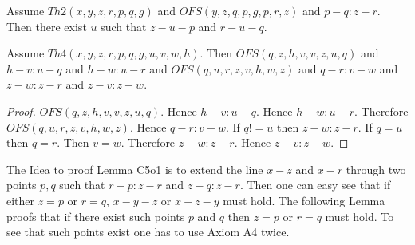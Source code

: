 \documentclass{article}
\begin{document}
\begin{forthel}
    \begin{lemma}[C5o1n]
      Assume $Th2(x,y,z,r,p,q,g)$ and $OFS(y,z,q,p,g,p,r,z)$ and $p-q : z-r$. Then there exist $u$ such that $z-u-p$ and $r-u-q$.
    \end{lemma}

    \begin{lemma}[C5o1o]
      Assume $Th4(x,y,z,r,p,q,g,u,v,w,h)$. Then $OFS(q,z,h,v,v,z,u,q)$ and $h-v : u-q$ and $h-w : u-r$ and $OFS(q,u,r,z,v,h,w,z)$ and $q-r : v-w$ and $z-w : z-r$ and $z-v : z-w$.
    \end{lemma}
    \begin{proof}
    	$OFS(q,z,h,v,v,z,u,q)$. Hence $h-v : u-q$.
      Hence $h-w : u-r$. %
    	Therefore $OFS(q,u,r,z,v,h,w,z)$. Hence $q-r : v-w$. If $q != u$ then $z-w : z-r$.
      If $q = u$ then $q = r$. %
    	Then $v = w$. Therefore $z-w : z-r$. Hence $z-v : z-w$.
    \end{proof}
  \end{forthel}

  The Idea to proof Lemma C5o1 is to extend the line $x-z$ and $x-r$ through two points $p,q$ such that $r-p : z-r$ and $z-q : z-r$. Then one can easy see that if either $z = p$ or $r = q$, $x-y-z$ or $x-z-y$ must hold. The following Lemma proofs that if there exist such points $p$ and $q$ then $z = p$ or $r = q$ must hold. To see that such points exist one has to use Axiom A4 twice.
\end{document}
